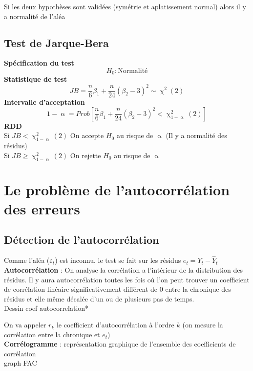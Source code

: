 \documentclass{article}
\begin{document}
Si les deux hypothèses sont validées (symétrie et aplatissement normal) alors il y a normalité de l'aléa
\subsection{Test de Jarque-Bera}
\textbf{Spécification du test}
\begin{equation*}
	H_0 : \text{Normalité}
\end{equation*}
\textbf{Statistique de test}
\begin{equation*}
	JB = \frac{n}{6} \beta_1 + \frac{n}{24} (\beta_2 -3)^2 \sim \upchi^2(2)
\end{equation*}
\textbf{Intervalle d'acceptation}
\begin{equation*}
	1 - \upalpha = Prob \left[ \frac{n}{6} \beta_1 + \frac{n}{24} (\beta_2 -3)^2 < \upchi^2_{1-\upalpha}(2)\right]
\end{equation*}
\textbf{RDD} \\
Si $JB < \upchi^2_{1-\upalpha}(2)$ On accepte $H_0$ au risque de $\upalpha$ {\color{red}(Il y a normalité des résidus)}\\
Si $JB \geq \upchi^2_{1-\upalpha}(2)$ On rejette $H_0$ au risque de $\upalpha$ \\

\section{Le problème de l'autocorrélation des erreurs}
\subsection{Détection de l'autocorrélation}
Comme l'aléa ($\varepsilon_t$) est inconnu, le test se fait sur les résidus $e_t = Y_t - \hat{Y}_t$
\textbf{Autocorrélation} : On analyse la corrélation a l'intérieur de la distribution des résidus. Il y aura autocorrélation toutes les fois où l'on peut trouver un coefficient de corrélation linéaire significativement différent de 0 entre la chronique des résidus et elle même décalée d'un ou de plusieurs pas de temps.\\

Dessin coef autocorrelation*

On va appeler $r_k$ le coefficient d'autocorrélation à l'ordre $k$ (on mesure la corrélation entre la chronique et $e_t$)\\

\textbf{Corrélogramme} : représentation graphique de l'ensemble des coefficients de corrélation\\
graph FAC\\
\end{document}
